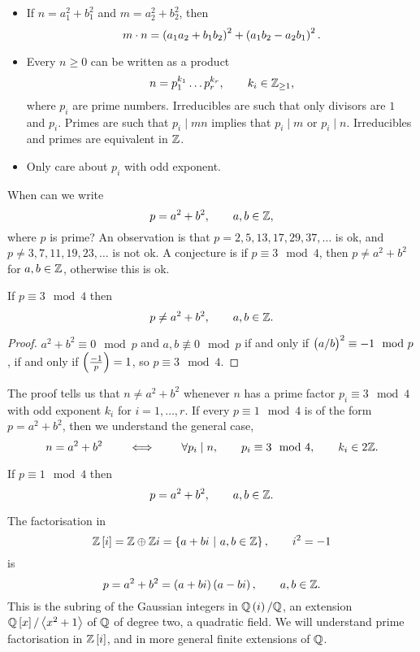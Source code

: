 \begin{itemize}
\item If $ n = a_1^2 + b_1^2 $ and $ m = a_2^2 + b_2^2 $, then
$$ m \cdot n = \br{a_1a_2 + b_1b_2}^2 + \br{a_1b_2 - a_2b_1}^2. $$
\item Every $ n \ge 0 $ can be written as a product
$$ n = p_1^{k_1} \dots p_r^{k_r}, \qquad k_i \in \mathbb{Z}_{\ge 1}, $$
where $ p_i $ are prime numbers. Irreducibles are such that only divisors are $ 1 $ and $ p_i $. Primes are such that $ p_i \mid mn $ implies that $ p_i \mid m $ or $ p_i \mid n $. Irreducibles and primes are equivalent in $ \mathbb{Z} $.
\item Only care about $ p_i $ with odd exponent.
\end{itemize}

When can we write
$$ p = a^2 + b^2, \qquad a, b \in \mathbb{Z}, $$
where $ p $ is prime? An observation is that $ p = 2, 5, 13, 17, 29, 37, \dots $ is ok, and $ p \ne 3, 7, 11, 19, 23, \dots $ is not ok. A conjecture is if $ p \equiv 3 \mod 4 $, then $ p \ne a^2 + b^2 $ for $ a, b \in \mathbb{Z} $, otherwise this is ok.

\pagebreak

\begin{theorem}
If $ p \equiv 3 \mod 4 $ then
$$ p \ne a^2 + b^2, \qquad a, b \in \mathbb{Z}. $$
\end{theorem}

\begin{proof}
$ a^2 + b^2 \equiv 0 \mod p $ and $ a, b \not\equiv 0 \mod p $ if and only if $ \br{a / b}^2 \equiv -1 \mod p $, if and only if $ \symbol{-1}{p} = 1 $, so $ p \equiv 3 \mod 4 $.
\end{proof}

\begin{remark*}
The proof tells us that $ n \ne a^2 + b^2 $ whenever $ n $ has a prime factor $ p_i \equiv 3 \mod 4 $ with odd exponent $ k_i $ for $ i = 1, \dots, r $. If every $ p \equiv 1 \mod 4 $ is of the form $ p = a^2 + b^2 $, then we understand the general case,
$$ n = a^2 + b^2 \qquad \iff \qquad \forall p_i \mid n, \qquad p_i \equiv 3 \mod 4, \qquad k_i \in 2\mathbb{Z}. $$
\end{remark*}

\begin{theorem}
If $ p \equiv 1 \mod 4 $ then
$$ p = a^2 + b^2, \qquad a, b \in \mathbb{Z}. $$
\end{theorem}

The factorisation in
$$ \ZZ\sbr{i} = \ZZ \oplus \ZZ i = \cbr{a + bi \st a, b \in \ZZ}, \qquad i^2 = -1 $$
is
$$ p = a^2 + b^2 = \br{a + bi}\br{a - bi}, \qquad a, b \in \ZZ. $$
This is the subring of the Gaussian integers in $ \QQ\br{i} / \QQ $, an extension $ \QQ\sbr{x} / \abr{x^2 + 1} $ of $ \mathbb{Q} $ of degree two, a quadratic field. We will understand prime factorisation in $ \ZZ\sbr{i} $, and in more general finite extensions of $ \mathbb{Q} $.

